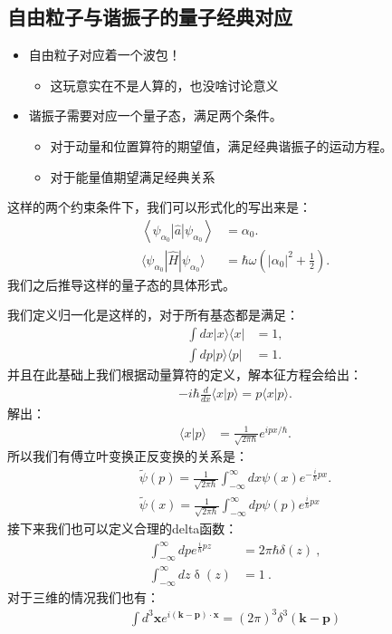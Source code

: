 \subsection{自由粒子与谐振子的量子经典对应}
\begin{itemize}
  \item 自由粒子对应着一个波包！
    \begin{itemize}
      \item 这玩意实在不是人算的，也没啥讨论意义
    \end{itemize}
  \item 谐振子需要对应一个量子态，满足两个条件。
    \begin{itemize}
      \item 对于动量和位置算符的期望值，满足经典谐振子的运动方程。
      \item 对于能量值期望满足经典关系
    \end{itemize}
\end{itemize}
这样的两个约束条件下，我们可以形式化的写出来是：
\begin{align}
  \left\langle\psi_{\alpha_{0}}|\hat{a}|\psi_{\alpha_{0}}\right\rangle&=\alpha_{0}.\\
  \langle\psi_{\alpha_0}|\hat{H}|\psi_{\alpha_0}\rangle&=\hbar\omega\left(|\alpha_0|^2+\frac{1}{2}\right).
\end{align}
我们之后推导这样的量子态的具体形式。

\bigskip
{}

我们定义归一化是这样的，对于所有基态都是满足：
\begin{align}
  \int dx |x\rangle\langle x|&=1,\\
  \int dp |p\rangle\langle p|&=1.
\end{align}
并且在此基础上我们根据动量算符的定义，解本征方程会给出：
\begin{align}
  -i\hbar\frac{d}{dx}\langle x|p\rangle=p\langle x|p\rangle.
\end{align}
解出：
\begin{align}
  \langle x|p\rangle&=\frac{1}{\sqrt{2\pi\hbar}}e^{ipx/\hbar}.
\end{align}
所以我们有傅立叶变换正反变换的关系是：
\begin{align}
  \tilde{{\psi}}(p)=\frac{1}{\sqrt{2\pi\hbar}}\int_{-\infty}^{\infty}dx{\psi}(x)e^{-\frac{i}{\hbar}px}.\\
  \tilde{{\psi}}(x)=\frac{1}{\sqrt{2\pi\hbar}}\int_{-\infty}^{\infty}dp{\psi}(p)e^{\frac{i}{\hbar}px}
\end{align}
接下来我们也可以定义合理的delta函数：
\begin{align}
  \int_{-\infty}^\infty dpe^{\frac i\hbar pz}&=2\pi\hbar\delta(z)\mathrm{~,}\\
  \int_{-\infty}^\infty dz\operatorname{\delta}(z)&=1\mathrm{~.}
\end{align}
对于三维的情况我们也有：
\begin{align}
  \int
  d^3\mathbf{x}e^{i(\mathbf{k-p})\cdot\mathbf{x}}=(2\pi)^3\delta^3(\mathbf{k-p})
\end{align}

